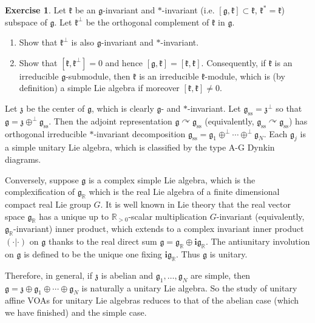 \documentclass[12pt,a4paper,notitlepage]{article}
\theoremstyle{definition}
\newtheorem{exe}[df]{Exercise}
\theoremstyle{plain}
\newcommand{\fk}{\mathfrak}
\newcommand{\gk}{\mathfrak g}
\newcommand{\zk}{\mathfrak z}
\newcommand{\im}{\mathbf{i}}
\newcommand{\Rbb}{\mathbb R}
\numberwithin{equation}{section}
\begin{document}
\begin{exe}
Let $\fk k$ be an $\gk$-invariant and $*$-invariant (i.e. $[\gk,\fk k]\subset\fk k$, $\fk k^*=\fk k$) subspace of $\gk$.  Let $\fk k^\perp$ be the orthogonal complement of $\fk k$ in $\gk$.
\begin{enumerate}
\item Show that $\fk k^\perp$ is also $\gk$-invariant and $*$-invariant.
\item Show that $[\fk k,\fk k^\perp]=0$ and hence $[\gk,\fk k]=[\fk k,\fk k]$. Consequently, if $\fk k$ is an irreducible $\gk$-submodule, then $\fk k$ is an irreducible $\fk k$-module, which is (by definition) a simple Lie algebra if moreover $[\fk k,\fk k]\neq 0$.
\end{enumerate}
\end{exe}


Let $\zk$ be the center of $\gk$, which is clearly $\gk$- and $*$-invariant. Let $\gk_{\mathrm{ss}}=\zk^\perp$ so that $\gk=\zk\oplus^\perp\gk_{\mathrm{ss}}$. Then the adjoint representation $\gk\curvearrowright\gk_{\mathrm{ss}}$ (equivalently, $\gk_{\mathrm{ss}}\curvearrowright\gk_{\mathrm{ss}}$) has orthogonal irreducible $*$-invariant decomposition $\gk_{\mathrm{ss}}=\gk_1\oplus^\perp\cdots\oplus^\perp\gk_N$. Each $\gk_j$ is a simple unitary Lie algebra, which is classified by the type A-G Dynkin diagrams.


Conversely, suppose $\gk$ is a complex simple Lie algebra, which is the complexification of $\gk_\Rbb$ which is the real Lie algebra of a finite dimensional compact real Lie group $G$. It is well known in Lie theory that the real vector space $\gk_\Rbb$ has a unique up to $\Rbb_{>0}$-scalar multiplication  $G$-invariant (equivalently, $\gk_\Rbb$-invariant) inner product, which extends to a complex invariant inner product $(\cdot|\cdot)$ on $\gk$ thanks to  the real direct sum $\gk=\gk_\Rbb\oplus\im\gk_\Rbb$. The antiunitary involution on $\gk$ is defined to be the unique one fixing $\im\gk_\Rbb$. Thus $\gk$ is unitary. 

Therefore, in general, if $\fk z$ is abelian and $\gk_1,\dots,\gk_N$ are simple, then $\gk=\fk z\oplus\gk_1\oplus\cdots\oplus\gk_N$ is naturally a unitary Lie algebra. So the study of unitary affine VOAs for unitary Lie algebras reduces to that of the abelian case (which we have finished) and the simple case.



\subsection{}
\end{document}
